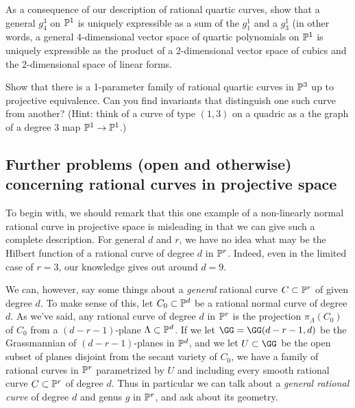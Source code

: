 \begin{exercise}
As a consequence of our description of rational quartic curves, show that a general $g^3_4$ on $\PP^1$ is uniquely expressible as a sum of the $g_1^1$ and a $g^1_3$
(in other words, a general 4-dimensional vector space of quartic polynomials on $\PP^1$ is uniquely expressible as the product of a 2-dimensional vector space of cubics and the 2-dimensional space of linear forms.
\end{exercise}

\begin{exercise}
Show that there is a 1-parameter family of rational quartic curves in $\PP^3$ up to projective equivalence. Can you find invariants that distinguish one such curve from another? (Hint: think of a curve of type $(1,3)$ on a quadric as a the graph of a degree 3 map $\PP^1 \to \PP^1$.)
\end{exercise}

\subsection{Further problems (open and otherwise) concerning rational curves in projective space}

To begin with, we should remark that this one example of a non-linearly normal rational curve in projective space is misleading in that we can give such a complete description. For general $d$ and $r$, we have no idea what may be the Hilbert function of a rational curve of degree $d$ in $\PP^r$. Indeed, even in the limited case of $r=3$, our knowledge gives out around $d=9$.

We can, however, say some things about a \emph{general} rational curve $C \subset \PP^r$ of given degree $d$. To make sense of this, let $C_0 \subset \PP^d$ be a rational normal curve of degree $d$. As we've said, any rational curve of degree $d$ in $\PP^r$ is the projection $\pi_\Lambda(C_0)$ of $C_0$ from a $(d-r-1)$-plane $\Lambda \subset \PP^d$. If we let $\GG = \GG(d-r-1, d)$ be the Grassmannian of $(d-r-1)$-planes in $\PP^d$, and we let $U \subset \GG$ be the open subset of planes disjoint from the secant variety of $C_0$, we have a family of rational curves in $\PP^r$ parametrized by $U$ and including every smooth rational curve $C \subset \PP^r$ of degree $d$. Thus in particular we can talk about a \emph{general rational curve} of degree $d$ and genus $g$ in $\PP^r$, and ask about its geometry.

